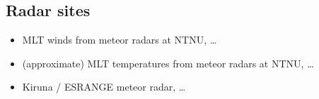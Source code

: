 \subsection{Radar sites}
\begin{itemize}
  \item MLT winds from meteor radars at NTNU, \ldots
  \item (approximate) MLT temperatures from meteor radars at NTNU, \ldots
  \item Kiruna / ESRANGE meteor radar, \ldots
\end{itemize}